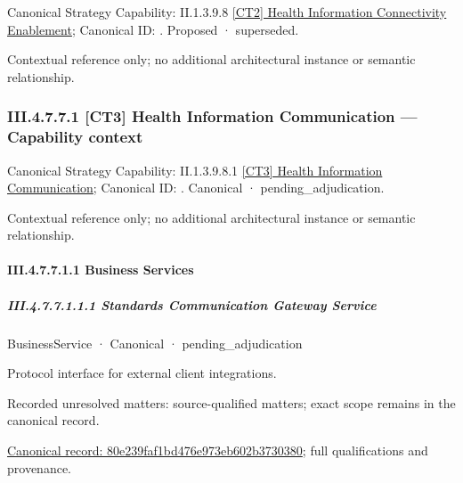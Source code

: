{\small Canonical Strategy Capability: II.1.3.9.8 \hyperref[element:6a1030483dfc4ae6af6998b587129d1c]{[CT2] Health Information Connectivity Enablement}; Canonical ID: \texttt{}. Proposed · superseded.}\par
Contextual reference only; no additional architectural instance or semantic relationship.\par
\subsubsection*{III.4.7.7.1 [CT3] Health Information Communication — Capability context}
\label{navigation:III.4.7.7.1}

{\small Canonical Strategy Capability: II.1.3.9.8.1 \hyperref[element:9794b2aff43443b495a19aefe0efa67b]{[CT3] Health Information Communication}; Canonical ID: \texttt{}. Canonical · pending\_adjudication.}\par
Contextual reference only; no additional architectural instance or semantic relationship.\par
\paragraph*{III.4.7.7.1.1 Business Services}
\label{navigation:III.4.7.7.1.1}

\subparagraph*{III.4.7.7.1.1.1 Standards Communication Gateway Service}
\label{navigation:III.4.7.7.1.1.1}

\label{element:80e239faf1bd476e973eb602b3730380}
{\small BusinessService · Canonical · pending\_adjudication}\par

Protocol interface for external client integrations.


{\small Recorded unresolved matters: source-qualified matters; exact scope remains in the canonical record.}\par
{\footnotesize \href{../../../../../../../continuum/business/business-service/80e239faf1bd476e973eb602b3730380.md}{Canonical record: 80e239faf1bd476e973eb602b3730380}; full qualifications and provenance.}\par

